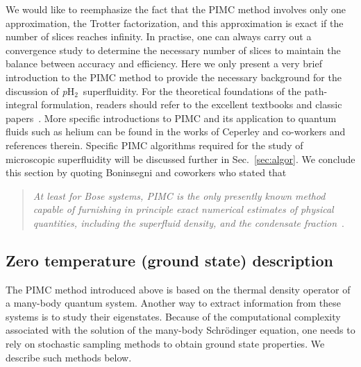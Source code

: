 \documentclass[12pt]{iopart}
\newcommand{\phtwo}{{\em p}H$_2$}
\begin{document}
We would like to reemphasize the fact that the PIMC method involves only one approximation, the Trotter factorization, and this approximation is exact if the number of slices reaches infinity. 
In practise, one can always carry out a convergence study to determine the necessary number of slices to maintain the balance between accuracy and efficiency. 
Here we only present a very brief introduction to the PIMC method to provide the necessary background for the discussion of \phtwo~superfluidity. 
For the theoretical foundations of the path-integral formulation, readers should refer to the excellent textbooks and classic papers~\cite{chandler_pimc1,feynman_pi_rmp,ceperley_rmp_1995,schulman_pi,feynman_hibbs,kleinert_pi,kashiwa_pi,Roepstorff_pi,weigel_pi,khandekar_pi,kristen_pi}. 
More specific introductions to PIMC and its application to quantum fluids such as helium can be found in the works of Ceperley and co-workers\cite{ceperley_rmp_1995,pimc_quantum_fluid,ceperley_pimc_quantum_fluid,ceperley_pimc_3He, ceperley_pimc_he_h2,ceperley_pimc_he_mix, galli_pimc_he,mcmahon_rmp_2012} and  references therein. 
Specific PIMC algorithms required for the study of microscopic superfluidity will be discussed further in Sec.~\ref{sec:algor}. 
We conclude this section by quoting Boninsegni and coworkers who stated that \begin{quote}
{\em At least for Bose systems, PIMC is the only presently known method capable of furnishing in principle exact numerical estimates of physical quantities, including the superfluid density, and the condensate fraction}~\cite{boninsegni_worm_1}.
\end{quote}

\subsection{Zero temperature (ground state) description}
The  PIMC method  introduced above is based on the thermal density operator of a many-body quantum system. Another way to extract information from these systems is to study their eigenstates. 
Because of the computational complexity associated with the solution of the many-body Schr\"odinger equation, one needs to rely on stochastic sampling methods to obtain ground state properties. 
We  describe such methods below.
\end{document}
